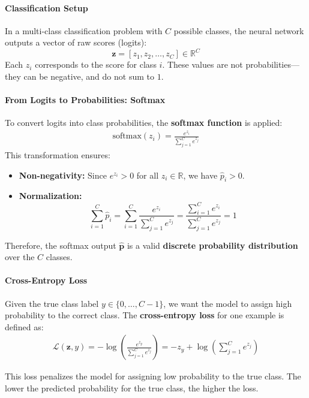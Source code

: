 \paragraph{Classification Setup}

In a multi-class classification problem with $C$ possible classes, the neural network outputs a vector of raw scores (logits):
\[
\mathbf{z} = [z_1, z_2, \dots, z_C] \in \mathbb{R}^{C}
\]
Each $z_i$ corresponds to the score for class $i$. These values are not probabilities—they can be negative, and do not sum to $1$.

\paragraph{From Logits to Probabilities: Softmax}

To convert logits into class probabilities, the \textbf{softmax function} is applied:
\begin{align}
	\text{softmax}(z_i) = \frac{e^{z_i}}{\sum_{j=1}^{C} e^{z_j}}
\end{align}
This transformation ensures:
\begin{itemize}
	\item \textbf{Non-negativity:} Since $e^{z_i} > 0$ for all $z_i \in \mathbb{R}$, we have $\hat{p}_i > 0$.
	\item \textbf{Normalization:}
	\[
	\sum_{i=1}^C \hat{p}_i = \sum_{i=1}^C \frac{e^{z_i}}{\sum_{j=1}^C e^{z_j}} = \frac{\sum_{i=1}^C e^{z_i}}{\sum_{j=1}^C e^{z_j}} = 1
	\]
\end{itemize}

Therefore, the softmax output $\hat{\mathbf{p}}$ is a valid \textbf{discrete probability distribution} over the $C$ classes.


\paragraph{Cross-Entropy Loss}

Given the true class label $y \in \{0, \dots, C-1\}$, we want the model to assign high probability to the correct class. The \textbf{cross-entropy loss} for one example is defined as:
\begin{align}
	\mathcal{L}(\mathbf{z}, y) = -\log\left( \frac{e^{z_y}}{\sum_{j=1}^{C} e^{z_j}} \right)
	= -z_y + \log\left( \sum_{j=1}^{C} e^{z_j} \right)
\end{align}

This loss penalizes the model for assigning low probability to the true class. The lower the predicted probability for the true class, the higher the loss.


